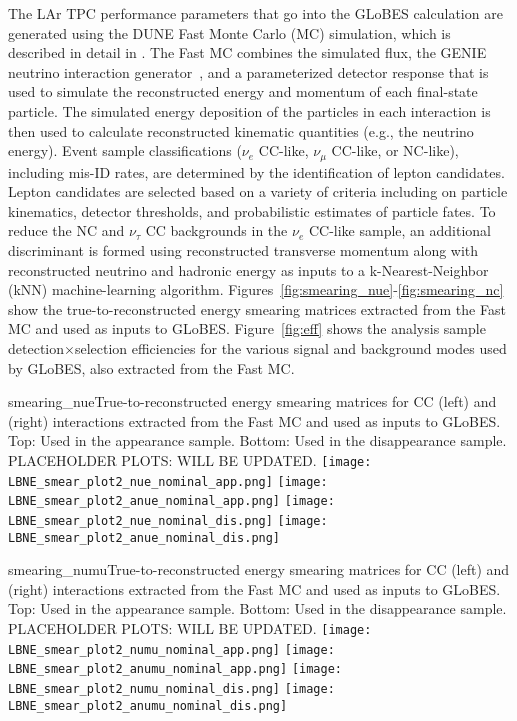 The LAr TPC performance parameters that go into the GLoBES calculation are generated using the DUNE Fast Monte Carlo (MC) simulation, which is described in detail in \cite{Adams:2013qkq}.  The Fast MC combines the simulated flux, the GENIE neutrino interaction generator~\cite{Andreopoulos:2009rq}, and a parameterized detector response that is used to simulate the reconstructed energy and momentum of each final-state particle.  The simulated energy deposition of the particles in each interaction is then used to calculate reconstructed kinematic quantities (e.g., the neutrino energy). Event sample classifications ($\nu_e$ CC-like, $\nu_{\mu}$ CC-like, or NC-like), including mis-ID rates, are determined by the identification of lepton candidates. Lepton candidates are selected based on a variety of criteria including on particle kinematics, detector thresholds, and probabilistic estimates of particle fates. To reduce the NC and $\nu_{\tau}$ CC backgrounds in the $\nu_e$ CC-like sample, an additional discriminant is formed using reconstructed transverse momentum along with reconstructed neutrino and hadronic energy as inputs to a k-Nearest-Neighbor (kNN) machine-learning algorithm.  Figures~\ref{fig:smearing_nue}-\ref{fig:smearing_nc} show the true-to-reconstructed energy smearing matrices extracted from the Fast MC and used as inputs to GLoBES.  Figure~\ref{fig:eff} shows the analysis sample detection$\times$selection efficiencies for the various signal and background modes used by GLoBES, also extracted from the Fast MC.

\begin{cdrfigure}{smearing_nue}{True-to-reconstructed energy smearing matrices for CC \nue (left) and \anue (right) interactions extracted from the Fast MC and used as inputs to GLoBES.  Top: Used in the appearance sample.  Bottom: Used in the disappearance sample. PLACEHOLDER PLOTS: WILL BE UPDATED.}
 \texttt{[image: LBNE\_smear\_plot2\_nue\_nominal\_app.png]}
 \texttt{[image: LBNE\_smear\_plot2\_anue\_nominal\_app.png]}
 \texttt{[image: LBNE\_smear\_plot2\_nue\_nominal\_dis.png]}
 \texttt{[image: LBNE\_smear\_plot2\_anue\_nominal\_dis.png]}
\end{cdrfigure}

\begin{cdrfigure}{smearing_numu}{True-to-reconstructed energy smearing matrices for CC \numu (left) and \anumu (right) interactions extracted from the Fast MC and used as inputs to GLoBES.  Top: Used in the appearance sample.  Bottom: Used in the disappearance sample. PLACEHOLDER PLOTS: WILL BE UPDATED.}
 \texttt{[image: LBNE\_smear\_plot2\_numu\_nominal\_app.png]}
 \texttt{[image: LBNE\_smear\_plot2\_anumu\_nominal\_app.png]}
 \texttt{[image: LBNE\_smear\_plot2\_numu\_nominal\_dis.png]}
 \texttt{[image: LBNE\_smear\_plot2\_anumu\_nominal\_dis.png]}
\end{cdrfigure}

